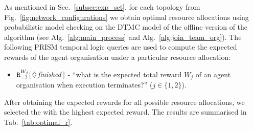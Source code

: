 \documentclass{llncs}
\begin{document}
As mentioned in Sec.~\ref{subsec:exp_set}, for each topology from Fig.~\ref{fig:network_configurations} we obtain optimal resource allocations using probabilistic model checking on the DTMC model of the offline version of the algorithm (see Alg.~\ref{alg:main_process} and Alg.~\ref{alg:join_team_org}). The following PRISM temporal logic queries are used to compute the expected rewards of the agent organisation under a particular resource allocation:
\begin{itemize}
 \item ${\tt R}_{=?}^{W_{j}}[\,\Diamond\,\mathit{finished}\,]$ -
``what is the expected total reward  $W_j$ of an agent organisation when execution terminates?'' ($j\in\{1,2\}$).
\end{itemize}
After obtaining the expected rewards for all possible resource allocations, we selected the with the highest expected reward. The results are summarised in Tab.~\ref{tab:optimal_r}.
\begin{table}[t]
\centering
{}
\caption{Model comparison for different numbers of agents in a fully connected agent organisation for the offline version of Alg.~\ref{alg:join_team_org}.}
\label{tab:model_sizes}
\end{table}
\end{document}
